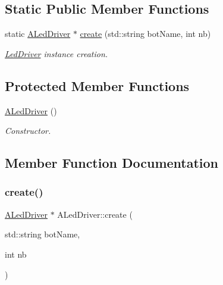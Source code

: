 \subsection*{Static Public Member Functions}
\begin{DoxyCompactItemize}
\item 
static \hyperlink{classALedDriver}{A\+Led\+Driver} $\ast$ \hyperlink{classALedDriver_a5ae5ce81a20d5d143ff1194ef2929302}{create} (std\+::string bot\+Name, int nb)
\begin{DoxyCompactList}\small\item\em \hyperlink{classLedDriver}{Led\+Driver} instance creation. \end{DoxyCompactList}\end{DoxyCompactItemize}
\subsection*{Protected Member Functions}
\begin{DoxyCompactItemize}
\item 
\mbox{\label{classALedDriver_ae7d91068831803e70771b780087dc57b}} 
\hyperlink{classALedDriver_ae7d91068831803e70771b780087dc57b}{A\+Led\+Driver} ()
\begin{DoxyCompactList}\small\item\em Constructor. \end{DoxyCompactList}\end{DoxyCompactItemize}


\subsection{Member Function Documentation}
\mbox{\label{classALedDriver_a5ae5ce81a20d5d143ff1194ef2929302}} 
\subsubsection{\texorpdfstring{create()}{create()}}
{\footnotesize\ttfamily \hyperlink{classALedDriver}{A\+Led\+Driver} $\ast$ A\+Led\+Driver\+::create (\begin{DoxyParamCaption}\item[{std\+::string}]{bot\+Name,  }\item[{int}]{nb }\end{DoxyParamCaption})\hspace{0.3cm}{\ttfamily [static]}}



